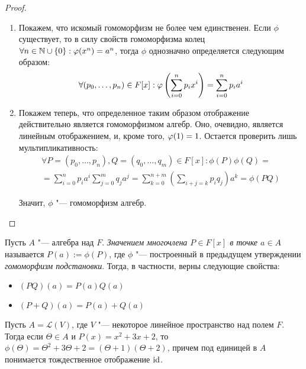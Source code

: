 \begin{proof}~
	\begin{enumerate}
		\item Покажем, что искомый гомоморфизм не более чем единственен. Если $\phi$ существует, то в силу свойств гомоморфизма колец $\forall n \in \mathbb{N} \cup \{0\}: \phi(x^n) \hm{=} a^n$, тогда $\phi$ однозначно определяется следующим образом:
		\[\forall (p_0, \dots, p_n) \in F[x]: \phi\left(\sum_{i = 0}^{n}p_ix^i\right) \hm{=} \sum_{i = 0}^{n}p_ia^i\]
		\item Покажем теперь, что определенное таким образом отображение действительно является гомоморфизмом алгебр. Оно, очевидно, является линейным отображением, и, кроме того, $\phi(1) \hm{=} 1$. Остается проверить лишь мультипликативность:
		\begin{multline*}
		\forall P = (p_0, \dots, p_n), Q = (q_0, \dots, q_m) \in F[x]: \phi(P)\phi(Q) =\\
		= \sum_{i = 0}^np_ia^i\sum_{j = 0}^mq_ja^j = \sum_{k = 0}^{n + m}\left(\sum_{i + j = k}p_iq_j\right)a^k = \phi(PQ)
		\end{multline*}
		
		Значит, $\phi$ "--- гомоморфизм алгебр.\qedhere
	\end{enumerate}
\end{proof}

\begin{definition}
	Пусть $A$ "--- алгебра над $F$. \textit{Значением многочлена $P \in F[x]$ в точке $a \in A$} называется $P(a) := \phi(P)$, где $\phi$ "--- построенный в предыдущем утверждении \textit{гомоморфизм подстановки}. Тогда, в частности, верны следующие свойства:
	\begin{itemize}
		\item $(PQ)(a) = P(a)Q(a)$
		\item $(P + Q)(a) = P(a) + Q(a)$
	\end{itemize}
\end{definition}

\begin{example}
	Пусть $A = \mathcal{L}(V)$, где $V$ "--- некоторое линейное пространство над полем $F$. Тогда если $\Theta \in A$ и $P(x) = x^2 + 3x + 2$, то $\phi(\Theta) = \Theta^2 + 3\Theta + 2 = (\Theta + 1)(\Theta + 2)$, причем под единицей в $A$ понимается тождественное отображение $\operatorname{id}$.
\end{example}